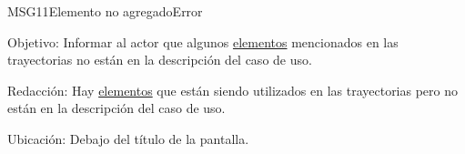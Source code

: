 \begin{mensaje}{MSG11}{Elemento no agregado}{Error}
	\item [Objetivo:] Informar al actor que algunos \hyperlink{tElemento}{elementos} mencionados en las trayectorias no están en la descripción del caso de uso.
	\item[Redacción:] Hay \hyperlink{tElemento}{elementos} que están siendo utilizados en las trayectorias pero no están en la descripción del caso de uso.
	\item [Ubicación:] Debajo del título de la pantalla.
\end{mensaje}